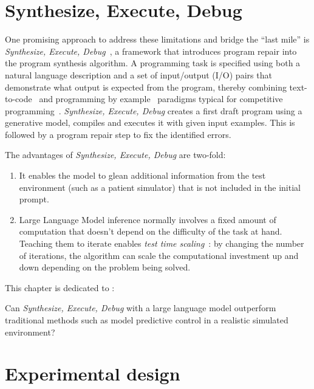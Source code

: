 \newpage
\section{Synthesize, Execute, Debug}
One promising approach to address these limitations and bridge the ``last mile'' is \emph{Synthesize, Execute, Debug}~\cite{guptaSynthesizeExecuteDebug2020}, a framework that introduces program repair into the program synthesis algorithm. 
A programming task is specified using both a natural language description and a set of input/output (I/O) pairs that demonstrate what output is expected from the program, thereby combining text-to-code~\cite{iyer2018:mapping} and programming by example~\cite{halbertProgrammingExample1984,gulwani2016:programming} paradigms typical for competitive programming~\cite{zavershynskyi2018:naps}.
\emph{Synthesize, Execute, Debug} creates a first draft program using a generative model, compiles and executes it with given input examples.
This is followed by a program repair step to fix the identified errors.

The advantages of \emph{Synthesize, Execute, Debug} are two-fold:

\begin{enumerate}
  \item It enables the model to glean additional information from the test environment (such as a patient simulator) that is not included in the initial prompt.
  \item Large Language Model inference normally involves a fixed amount of computation that doesn't depend on the difficulty of the task at hand. Teaching them to iterate enables \emph{test time scaling}~\cite{zhangWhatHowWhere2025}: by changing the number of iterations, the algorithm can scale the computational investment up and down depending on the problem being solved.
\end{enumerate}

This chapter is dedicated to \rqboptest:

\begin{highlight}
  Can \emph{Synthesize, Execute, Debug} with a large language model outperform traditional methods such as model predictive control in a realistic simulated environment?
\end{highlight}

\newpage
\section{Experimental design}
\label{sec:BOPTEST}

